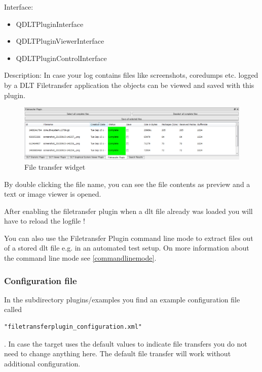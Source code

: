 \documentclass[a4paper,11pt]{article}
\begin{document}
Interface:
\begin{itemize}
    \item QDLTPluginInterface
    \item QDLTPluginViewerInterface
    \item QDLTPluginControlInterface
\end{itemize}
Description:
    In case your log contains files like screenshots, coredumps etc. logged by a DLT Filetransfer application
    the objects can be viewed and saved with this plugin. \linebreak

\par

\begin{figure}[H]
 \centering
 \includegraphics[width=1.0\textwidth]{images/filetransfer_list.png}
 \caption{File transfer widget}
 \label{fig:filetransferwidget}
\end{figure}


By double clicking the file name, you can see the file contents as preview and a text or image viewer is opened.

After enabling the filetransfer plugin when a dlt file already was loaded you will have to reload the logfile !

You can also use the Filetransfer Plugin command line mode to extract files out of a stored dlt file e.g. in an automated test setup.
On more information about the command line mode see \autoref{commandlinemode}.

\subsubsection{Configuration file}
In the subdirectory plugins/examples you find an example configuration file called \begin{verbatim}"filetransferplugin_configuration.xml"\end{verbatim}.
In case the target uses the default values to indicate file transfers you do not need to change anything here.
The default file transfer will work without additional configuration.
\end{document}
